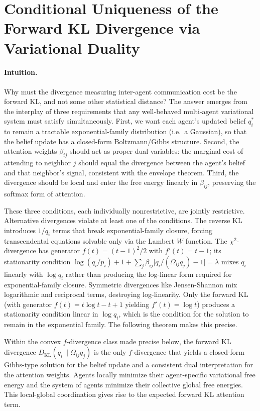 \documentclass[twoside,11pt]{article}
\begin{document}
\section{Conditional Uniqueness of the Forward KL Divergence via Variational Duality}
\label{sec:supp_conditional_uniqueness}

\paragraph{Intuition.}
Why must the divergence measuring inter-agent communication cost be the forward KL, and not some other statistical distance? The answer emerges from the interplay of three requirements that any well-behaved multi-agent variational system must satisfy simultaneously. First, we want each agent's updated belief $q_i^*$ to remain a tractable exponential-family distribution (i.e.\ a Gaussian), so that the belief update has a closed-form Boltzmann/Gibbs structure. Second, the attention weights $\beta_{ij}$ should act as proper dual variables: the marginal cost of attending to neighbor $j$ should equal the divergence between the agent's belief and that neighbor's signal, consistent with the envelope theorem. Third, the divergence should be local and enter the free energy linearly in $\beta_{ij}$, preserving the softmax form of attention.

These three conditions, each individually nonrestrictive, are jointly restrictive. Alternative divergences violate at least one of the conditions. The reverse KL introduces $1/q_i$ terms that break exponential-family closure, forcing transcendental equations solvable only via the Lambert $W$ function. The $\chi^2$-divergence has generator $f(t)=(t-1)^2/2$ with $f'(t)=t-1$; its stationarity condition $\log(q_i/p_i) + 1 + \sum_j \beta_{ij}\bigl[q_i/(\Omega_{ij}q_j) - 1\bigr] = \lambda$ mixes $q_i$ linearly with $\log q_i$ rather than producing the log-linear form required for exponential-family closure. Symmetric divergences like Jensen-Shannon mix logarithmic and reciprocal terms, destroying log-linearity. Only the forward KL (with generator $f(t) = t\log t - t + 1$ yielding $f'(t) = \log t$) produces a stationarity condition linear in $\log q_i$, which is the condition for the solution to remain in the exponential family. The following theorem makes this precise.

Within the convex $f$-divergence class made precise below, the forward KL divergence $D_{\mathrm{KL}}(q_i \| \Omega_{ij} q_j)$ is the only $f$-divergence that yields a closed-form Gibbs-type solution for the belief update and a consistent dual interpretation for the attention weights. Agents locally minimize their agent-specific variational free energy and the system of agents minimize their collective global free energies. This local-global coordination gives rise to the expected forward KL attention term.
\end{document}
